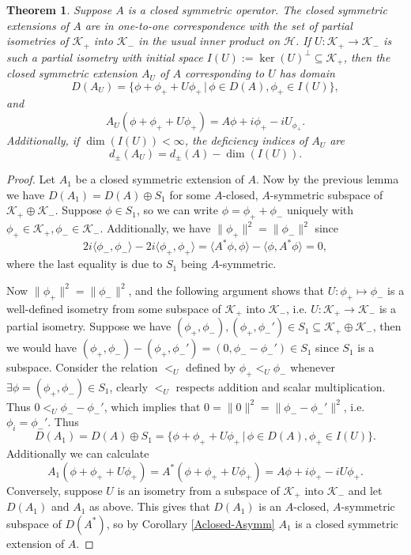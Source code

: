 \documentclass[12pt,oneside]{report}
\newtheorem{thm}{Theorem}[chapter]
\begin{document}
\begin{thm}
    Suppose $A$ is a closed symmetric operator. The closed symmetric extensions of $A$ are in one-to-one correspondence with the set of partial isometries of $\mathscr{K}_{+}$ into $\mathscr{K}_{-}$ in the usual inner product on $\mathscr{H}$. If $U: \mathscr{K}_{+} \to \mathscr{K}_{-}$ is such a partial isometry with initial space $I(U) := \ker(U)^{\perp} \subseteq \mathscr{K}_{+}$, then the closed symmetric extension $A_{U}$ of $A$ corresponding to $U$ has domain $$D(A_{U}) = \{ \phi + \phi_{+} + U\phi_{+} \, | \, \phi \in D(A), \phi_{+} \in I(U) \},$$and $$A_{U}(\phi + \phi_{+} + U\phi_{+}) = A\phi + i\phi_{+} - iU_{\phi_{+}}.$$Additionally, if $\dim(I(U)) < \infty$, the deficiency indices of $A_{U}$ are $$d_{\pm}(A_{U}) = d_{\pm}(A) - \dim(I(U)).$$
\end{thm}
\begin{proof}
    Let $A_{1}$ be a closed symmetric extension of $A$. Now by the previous lemma we have $D(A_{1}) = D(A) \oplus S_{1}$ for some $A$-closed, $A$-symmetric subspace of $\mathscr{K}_{+} \oplus \mathscr{K}_{-}$. Suppose $\phi \in S_{1}$, so we can write $\phi = \phi_{+} + \phi_{-}$ uniquely with $\phi_{+} \in \mathscr{K}_{+}, \phi_{-} \in \mathscr{K}_{-}$. Additionally, we have $\|\phi_{+}\|^{2} = \|\phi_{-}\|^{2}$ since $$2i\langle\phi_{-},\phi_{-}\rangle - 2i\langle\phi_{+},\phi_{+}\rangle = \langle A^{*}\phi,\phi \rangle - \langle\phi,A^{*}\phi \rangle = 0,$$ where the last equality is due to $S_{1}$ being $A$-symmetric.

    Now $\|\phi_{+}\|^{2} = \|\phi_{-}\|^{2}$, and the following argument shows that $U: \phi_{+} \mapsto \phi_{-}$ is a well-defined isometry from some subspace of $\mathscr{K}_{+}$ into $\mathscr{K}_{-}$, i.e. $U: \mathscr{K}_{+} \to \mathscr{K}_{-}$ is a partial isometry. Suppose we have $(\phi_{+},\phi_{-}), (\phi_{+},\phi_{-}') \in S_{1} \subseteq \mathscr{K}_{+} \oplus \mathscr{K}_{-}$, then we would have $(\phi_{+},\phi_{-}) - (\phi_{+}, \phi_{-}') = (0, \phi_{-} - \phi_{-}') \in S_{1}$ since $S_{1}$ is a subspace. Consider the relation $<_{U}$ defined by $\phi_{+} <_{U} \phi_{-}$ whenever $\exists \phi = (\phi_{+},\phi_{-}) \in S_{1}$, clearly $<_{U}$ respects addition and scalar multiplication. Thus $0 <_{U} \phi_{-} - \phi_{-}'$, which implies that $0 = \|0\|^{2} = \|\phi_{-}-\phi_{-}'\|^{2}$, i.e. $\phi_{i} = \phi_{-}'$. Thus $$D(A_{1}) = D(A) \oplus S_{1} = \{ \phi + \phi_{+} + U\phi_{+} \, | \, \phi \in D(A), \phi_{+} \in I(U) \}.$$ Additionally we can calculate $$A_{1}(\phi+\phi_{+}+U\phi_{+}) = A^{*}(\phi+\phi_{+}+U\phi_{+}) = A\phi + i\phi_{+} - iU\phi_{+}.$$
    Conversely, suppose $U$ is an isometry from a subspace of $\mathscr{K}_{+}$ into $\mathscr{K}_{-}$ and let $D(A_{1})$ and $A_{1}$ as above. This gives that $D(A_{1})$ is an $A$-closed, $A$-symmetric subspace of $D(A^{*})$, so by Corollary \ref{Aclosed-Asymm} $A_{1}$ is a closed symmetric extension of $A$.


\end{proof}
\end{document}
